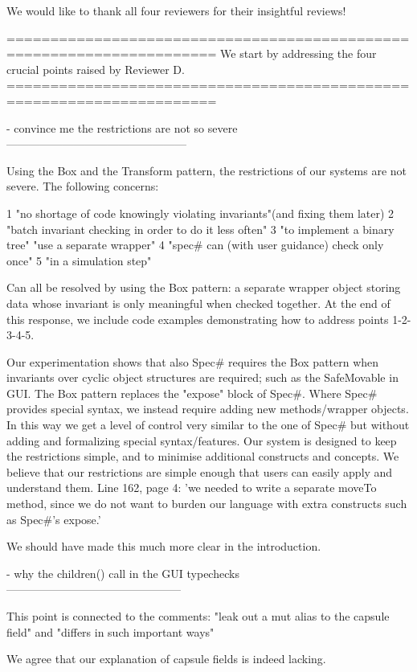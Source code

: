 We would like to thank all four reviewers for their insightful reviews!

======================================================================
We start by addressing the four crucial points raised by Reviewer D.
======================================================================

- convince me the restrictions are not so severe
------------------------------------------------

Using the Box and the Transform pattern, the restrictions of our systems are not severe.
The following concerns:

1 "no shortage of code knowingly violating invariants"(and fixing them later)
2 "batch invariant checking in order to do it less often"
3 "to implement a binary tree" "use a separate wrapper"
4 "spec# can (with user guidance) check only once"
5 "in a simulation step"

Can all be resolved by using the Box pattern: a separate wrapper object storing data
whose invariant is only meaningful when checked together.
At the end of this response, we include code examples demonstrating how to address points 1-2-3-4-5.

Our experimentation shows that also Spec# requires the Box pattern when
invariants over cyclic object structures are required; such as the SafeMovable in GUI.
The Box pattern replaces the "expose" block of Spec#.
Where Spec# provides special syntax, we instead require adding new methods/wrapper
objects. In this way we get a level of control very similar to the one of Spec#
but without adding and formalizing special syntax/features.
Our system is designed to keep the restrictions simple, and to minimise additional constructs and concepts.
We believe that our restrictions are simple enough that users can easily apply and understand them.
Line 162, page 4: 'we needed to write a separate moveTo method, since we do not want to burden our language with extra constructs such as Spec#’s expose.' 

We should have made this much more clear in the introduction.


- why the children() call in the GUI typechecks
-----------------------------------------------

This point is connected to the comments: "leak out a mut alias to the capsule field" and "differs in such important ways"

We agree that our explanation of capsule fields is indeed lacking.

